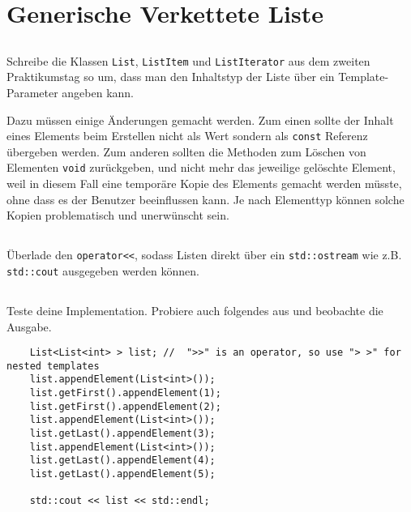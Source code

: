 \section{Generische Verkettete Liste}
\label{sec:list}
\subsection{}
Schreibe die Klassen \texttt{List}, \texttt{ListItem} und \texttt{ListIterator} aus dem zweiten Praktikumstag so um, dass man den Inhaltstyp der Liste über ein Template-Parameter angeben kann.

Dazu müssen einige Änderungen gemacht werden.
Zum einen sollte der Inhalt eines Elements beim Erstellen nicht als Wert sondern als \texttt{const} Referenz übergeben werden.
Zum anderen sollten die Methoden zum Löschen von Elementen \texttt{void} zurückgeben, und nicht mehr das jeweilige gelöschte Element, weil in diesem Fall eine temporäre Kopie des Elements gemacht werden müsste, ohne dass es der Benutzer beeinflussen kann.
Je nach Elementtyp können solche Kopien problematisch und unerwünscht sein.


\subsection{}
Überlade den \texttt{operator<<}, sodass Listen direkt über ein \texttt{std::ostream} wie z.B. \texttt{std::cout} ausgegeben werden können.

\subsection{}
Teste deine Implementation. Probiere auch folgendes aus und beobachte die Ausgabe.

\begin{lstlisting}
	List<List<int> > list; //  ">>" is an operator, so use "> >" for nested templates
	list.appendElement(List<int>());
	list.getFirst().appendElement(1);
	list.getFirst().appendElement(2);
	list.appendElement(List<int>());
	list.getLast().appendElement(3);
	list.appendElement(List<int>());
	list.getLast().appendElement(4);
	list.getLast().appendElement(5);
	
	std::cout << list << std::endl;
\end{lstlisting}
